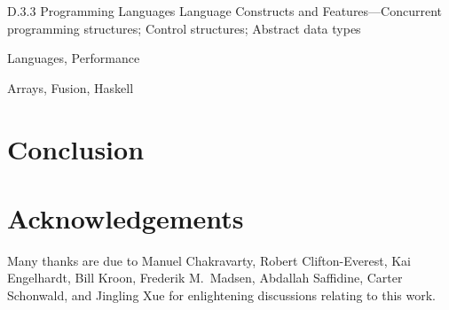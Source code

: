 \documentclass[preprint]{sigplanconf}
\begin{document}
\category
	{D.3.3}
	{Programming Languages}
	{Language Constructs and Features---Concurrent programming structures; Control structures; Abstract data types}

\terms
	Languages, Performance

\keywords
	Arrays, Fusion, Haskell







\section{Conclusion}

\section*{Acknowledgements}
Many thanks are due to
Manuel Chakravarty,
Robert Clifton-Everest,
Kai Engelhardt,
Bill Kroon,
Frederik M.\ Madsen,
Abdallah Saffidine,
Carter Schonwald,
and Jingling Xue
for enlightening discussions relating to this work.



\end{document}
